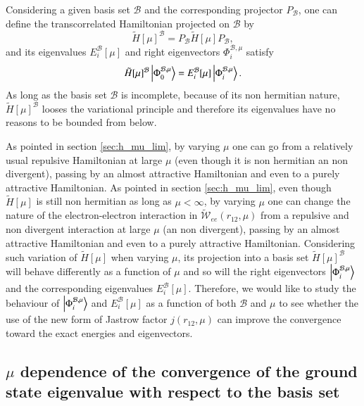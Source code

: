 \documentclass[aip,jcp,reprint,noshowkeys,superscriptaddress]{revtex4-1}
\newcommand{\phimub}[0]{\Phi^{\mathcal{B},\mu}_0}
\newcommand{\phiimub}[0]{\Phi^{\mathcal{B},\mu}_i}
\newcommand{\basis}[0]{\mathcal{B}}
\begin{document}
Considering a given basis set $\basis$ and the corresponding projector $P_\basis$, one can define the transcorrelated Hamiltonian projected on $\basis$ by
\begin{equation}
 \tilde{H}[\mu]^{\basis} = P_\basis \tilde{H}[\mu] P_\basis,
\end{equation}
and its eigenvalues $E_i^{\basis}[\mu]$ and right eigenvectors $\phiimub$ satisfy 
\begin{equation}
 \tilde{H}[\mu]^{\basis} \ket{\phimub} = E_i^{\basis}[\mu] \ket{\phiimub}. 
\end{equation}
As long as the basis set $\basis$ is incomplete, because of its non hermitian nature, $\tilde{H}[\mu]^{\basis}$ looses the variational principle and therefore its eigenvalues have no reasons to be bounded from below.  

As pointed in section \ref{sec:h_mu_lim}, by varying $\mu$ one can go from a relatively usual repulsive Hamiltonian at large $\mu$ (even though it is non hermitian an non divergent), passing by an almost attractive Hamiltonian and even to a purely attractive Hamiltonian. 
As pointed in section \ref{sec:h_mu_lim}, even though $\tilde{H}[\mu]$ is still non hermitian as long as $\mu < \infty$, by varying $\mu$ one can change the nature of the electron-electron interaction in $\tilde{\mathcal{W}}_{ee}(r_{12},\mu)$ from a repulsive and non divergent interaction at large $\mu$ (an non divergent), passing by an almost attractive Hamiltonian and even to a purely attractive Hamiltonian. 
Considering such variation of $\tilde{H}[\mu]$ when varying $\mu$,  
its projection into a basis set $\tilde{H}[\mu]^{\basis}$ will behave differently as a function of $\mu$ 
and so will the right eigenvectors $\ket{\phiimub}$ and the corresponding eigenvalues $E_i^{\basis}[\mu]$. 
Therefore, we would like to study the behaviour of $\ket{\phiimub}$ and $E_i^{\basis}[\mu]$ as a function of both $\basis$ and $\mu$ to see whether the use of the new form of Jastrow factor $j(r_{12},\mu)$ can improve the convergence toward the exact energies  and eigenvectors. 
\subsection{$\mu$ dependence of the convergence of the ground state eigenvalue with respect to the basis set }
\end{document}

